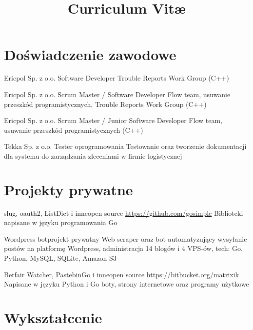 \documentclass[11pt,a4paper,sans,polish]{moderncv}   %
\title{Curriculum Vit\ae{}}
\begin{document}
\makecvtitle

\vspace{-0.8cm}


\section{Doświadczenie zawodowe}

	{Ericpol Sp. z o.o.}{}{}
	{Software Developer}
	{Trouble Reports Work Group (C++)}

	{Ericpol Sp. z o.o.}{}{}
	{Scrum Master / Software Developer}
	{Flow team, usuwanie przeszkód programistycznych, Trouble Reports Work Group (C++)}

	{Ericpol Sp. z o.o.}{}{}
	{Scrum Master / Junior Software Developer}
	{Flow team, usuwanie przeszkód programistycznych (C++)}

	{Tekka Sp. z o.o.}{}{}
	{Tester oprogramowania}
	{Testowanie oraz tworzenie dokumentacji dla systemu do zarządzania
	zleceniami w firmie logistycznej}


\section{Projekty prywatne}

	{slug, oauth2, ListDict i inne}{open source}{}
	{\url{https://github.com/gosimple}}
	{Biblioteki napisane w języku programowania Go}

	{Wordpress bot}{projekt prywatny}{}
	{}
	{Web scraper oraz bot automatyzujący wysyłanie postów na platformę Wordpress,
		administracja 14 blogów i 4 VPS-ów, tech: Go, Python, MySQL, SQLite, Amazon S3}

	{Betfair Watcher, PastebinGo i inne}{open source}{}
	{\url{https://bitbucket.org/matrixik}}
	{Napisane w języku Python i Go boty, strony internetowe oraz programy użytkowe}


\section{Wykształcenie}

\vspace{-0.2cm}
\end{document}
